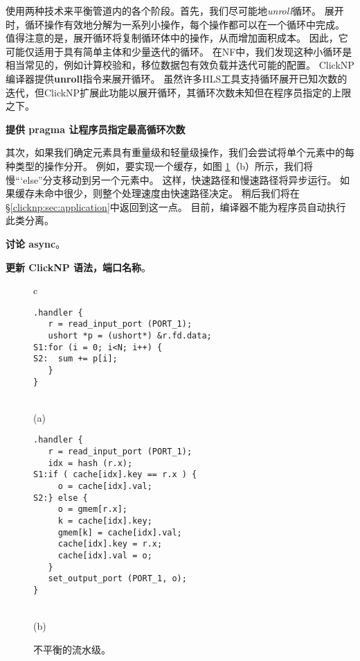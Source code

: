 \name 使用两种技术来平衡管道内的各个阶段。首先，我们尽可能地\textit {unroll}循环。
展开时，循环操作有效地分解为一系列小操作，每个操作都可以在一个循环中完成。
值得注意的是，展开循环将复制循环体中的操作，从而增加面积成本。
因此，它可能仅适用于具有简单主体和少量迭代的循环。
在NF中，我们发现这种小循环是相当常见的，例如计算校验和，移位数据包有效负载并迭代可能的配置。
ClickNP编译器提供\textbf {unroll}指令来展开循环。
虽然许多HLS工具支持循环展开已知次数的迭代，但ClickNP扩展此功能以展开循环，其循环次数未知但在程序员指定的上限之下。

\textbf{提供 pragma 让程序员指定最高循环次数}

其次，如果我们确定元素具有重量级和轻量级操作，我们会尝试将单个元素中的每种类型的操作分开。
例如，要实现一个缓存，如图 \ref {clicknp:fig:unbalance}（b）所示，我们将慢“`else”分支移动到另一个元素中。
这样，快速路径和慢速路径将异步运行。
如果缓存未命中很少，则整个处理速度由快速路径决定。
稍后我们将在\S \ref {clicknp:sec:application}中返回到这一点。
目前，\name 编译器不能为程序员自动执行此类分离。

\textbf{讨论 async}。

\textbf{更新 ClickNP 语法，端口名称}。



\begin{figure}
\lstset{style=numbers}

\centering

\begin{tabular}{c}
{
\small
\begin{lstlisting}[escapechar=@]
.handler {
   r = read_input_port (PORT_1);
   ushort *p = (ushort*) &r.fd.data;
S1:for (i = 0; i<N; i++) {
S2:  sum += p[i];
   }
}
\end{lstlisting} 
} \\
(a) \vspace{3pt} \\
{
\small 
\begin{lstlisting}[escapechar=@]
.handler {
   r = read_input_port (PORT_1);
   idx = hash (r.x);
S1:if ( cache[idx].key == r.x ) {
     o = cache[idx].val;
S2:} else {
     o = gmem[r.x];
     k = cache[idx].key;
     gmem[k] = cache[idx].val;
     cache[idx].key = r.x;
     cache[idx].val = o;
   }
   set_output_port (PORT_1, o);
}
\end{lstlisting} 
} \\
(b) \vspace{3pt} 
\end{tabular}

\caption{不平衡的流水级。}
\label{clicknp:fig:unbalance}

\end{figure}



